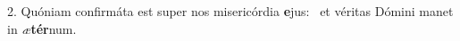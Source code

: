 2. Quóniam confirmáta est super nos misericórdia \textbf{e}jus: \ast\  et véritas Dómini manet in \textit{æ}\textbf{tér}num.\

